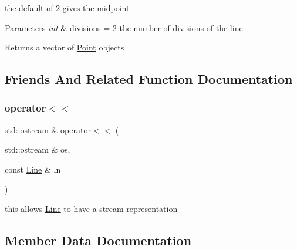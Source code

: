the default of 2 gives the midpoint 
\begin{DoxyParams}{Parameters}
{\em int} & divisions = 2 the number of divisions of the line \\
\hline
\end{DoxyParams}
\begin{DoxyReturn}{Returns}
a vector of \mbox{\hyperlink{class_jinks_draw_1_1_point}{Point}} objects 
\end{DoxyReturn}


\subsection{Friends And Related Function Documentation}
\mbox{\label{class_jinks_draw_1_1_line_a9ed7047351912d1052d709dfa4aac3c9}} 
\subsubsection{\texorpdfstring{operator$<$$<$}{operator<<}}
{\footnotesize\ttfamily std\+::ostream \& operator$<$$<$ (\begin{DoxyParamCaption}\item[{std\+::ostream \&}]{os,  }\item[{const \mbox{\hyperlink{class_jinks_draw_1_1_line}{Line}} \&}]{ln }\end{DoxyParamCaption})\hspace{0.3cm}{\ttfamily [friend]}}



this allows \mbox{\hyperlink{class_jinks_draw_1_1_line}{Line}} to have a stream representation 


\begin{DoxyCode}{0}
\end{DoxyCode}
 

\subsection{Member Data Documentation}
\mbox{\label{class_jinks_draw_1_1_line_a6c04e4d06b7c8bafff608b1ffae6169b}} 
